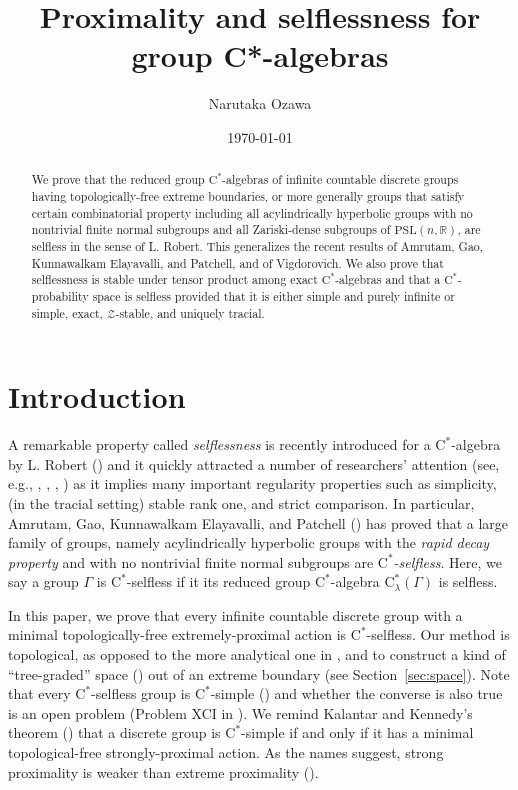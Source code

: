 \documentclass[12pt,nosumlimits,nonamelimits]{amsart}
\title{Proximality and selflessness for group C*-alge\-bras}
\author{Narutaka Ozawa}
\date{\today}
\theoremstyle{remark}
\theoremstyle{definition}
\newcommand{\Ga}{\Gamma}
\begin{document}
\begin{abstract}
We prove that the reduced group $\mathrm{C}^*$-alge\-bras 
of infinite countable discrete groups having topologically-free 
extreme boundaries, or more generally groups that satisfy 
certain combinatorial property including 
all acylindrically hyperbolic groups with no nontrivial finite normal subgroups 
and all Zariski-dense subgroups of $\mathrm{PSL}(n,\mathbb{R})$, 
are selfless in the sense of L. Robert. 
This generalizes the recent results of 
Amrutam, Gao, Kunnawalkam Elayavalli, and Patchell, and of Vigdorovich.
We also prove that selflessness is stable under 
tensor product among exact $\mathrm{C}^*$-alge\-bras 
and that a $\mathrm{C}^*$-prob\-a\-bility space is selfless 
provided that it is either simple and purely infinite or simple, 
exact, $\mathcal{Z}$-stable, and uniquely tracial. 
\end{abstract}
%
\maketitle
%
\section{Introduction}
%  
A remarkable property called \emph{selflessness} is recently 
introduced for a $\mathrm{C}^*$-alge\-bra by L. Robert (\cite{robert}) 
and it quickly attracted a number of researchers' attention 
(see, e.g., \cite{agkep}, \cite{hker}, \cite{rtv}, \cite{vigdorovich})
as it implies many important regularity properties such as 
simplicity, (in the tracial setting) stable rank one, 
and strict comparison. 
In particular,  Amrutam, Gao, Kunnawalkam Elayavalli, 
and Patchell (\cite{agkep}) has proved that a large family 
of groups, namely acylindrically hyperbolic groups 
with the \emph{rapid decay property} and with no nontrivial 
finite normal subgroups are \emph{$\mathrm{C}^*$-selfless}. 
Here, we say a group $\Ga$ is $\mathrm{C}^*$-selfless if it 
its reduced group $\mathrm{C}^*$-alge\-bra 
$\mathrm{C}^*_\lambda(\Ga)$ is selfless. 

In this paper, we prove that every infinite countable 
discrete group with a minimal topologically-free 
extremely-proximal action is $\mathrm{C}^*$-selfless. 
Our method is topological, as opposed to the more 
analytical one in \cite{agkep}, and to construct 
a kind of ``tree-graded'' space (\cite{ds}) out of an extreme 
boundary (see Section~\ref{sec:space}). 
Note that every $\mathrm{C}^*$-selfless group 
is $\mathrm{C}^*$-simple (\cite{robert}) and 
whether the converse is also true is 
an open problem (Problem XCI in \cite{stw}).
We remind Kalantar and Kennedy's theorem (\cite{kk}) that 
a discrete group is $\mathrm{C}^*$-simple if and only if 
it has a minimal topological-free strongly-proximal action. 
As the names suggest, strong proximality is weaker than 
extreme proximality (\cite{glasner}). 
\end{document}
